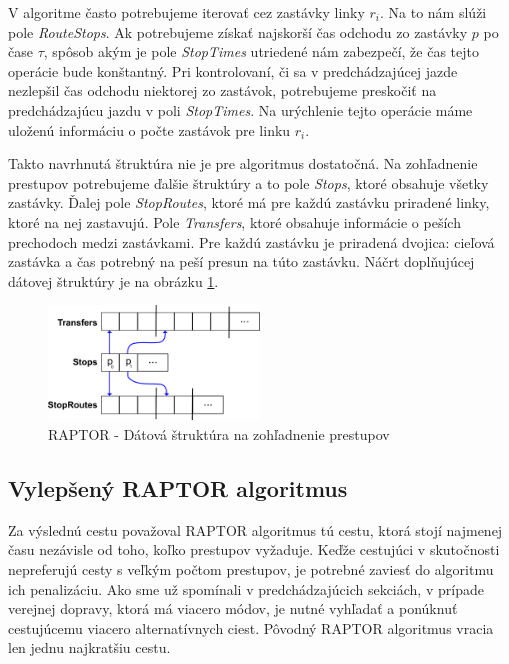V algoritme často potrebujeme iterovať cez zastávky linky $r_i$. Na to nám slúži pole \textit{RouteStops}. Ak potrebujeme získať najskorší čas odchodu zo zastávky $p$ po čase $\tau$, spôsob akým je pole \textit{StopTimes} utriedené nám zabezpečí, že čas tejto operácie bude konštantný.
Pri kontrolovaní, či sa v predchádzajúcej jazde nezlepšil čas odchodu niektorej zo zastávok, potrebujeme preskočiť na predchádzajúcu jazdu v poli \textit{StopTimes}. Na urýchlenie tejto operácie máme uloženú informáciu o počte zastávok pre linku $r_i$.

Takto navrhnutá štruktúra nie je pre algoritmus dostatočná. Na zohľadnenie prestupov potrebujeme ďalšie štruktúry a to pole \textit{Stops}, ktoré obsahuje všetky zastávky. Ďalej pole \textit{StopRoutes}, ktoré má pre každú zastávku priradené linky, ktoré na nej zastavujú. Pole \textit{Transfers}, ktoré obsahuje informácie o peších prechodoch medzi zastávkami. Pre každú zastávku je priradená dvojica: cieľová zastávka a čas potrebný na peší presun na túto zastávku. Náčrt doplňujúcej dátovej štruktúry je na obrázku \ref{fig:raptor-structure2}.

\begin{figure}[H]
\centerline{\includegraphics[width=0.5\textwidth]{images/raptor-structure2}}
\caption[RAPTOR - Dátová štruktúra na zohľadnenie prestupov]{RAPTOR - Dátová štruktúra na zohľadnenie prestupov}
\label{fig:raptor-structure2}
\end{figure}

\subsection{Vylepšený RAPTOR algoritmus}
\label{sec:raptor-improved}
Za výslednú cestu považoval RAPTOR algoritmus tú cestu, ktorá stojí najmenej času nezávisle od toho, koľko prestupov vyžaduje. Keďže cestujúci v skutočnosti nepreferujú cesty s veľkým počtom prestupov, je potrebné zaviesť do algoritmu ich penalizáciu. Ako sme už spomínali v predchádzajúcich sekciách, v prípade verejnej dopravy, ktorá má viacero módov, je nutné vyhľadať a ponúknuť cestujúcemu viacero alternatívnych ciest. Pôvodný RAPTOR algoritmus vracia len jednu najkratšiu cestu. 

